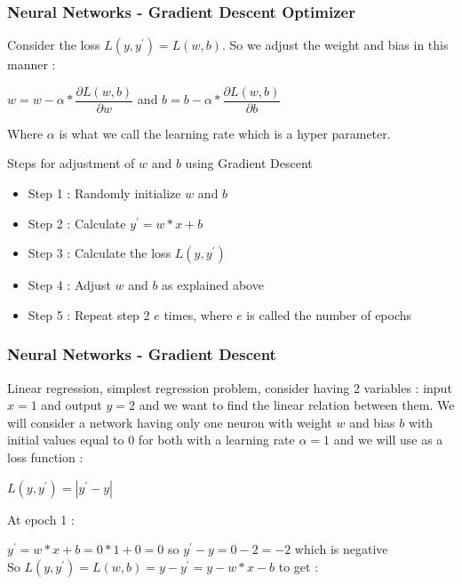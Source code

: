 \documentclass{beamer}
\begin{document}
\begin{frame}

\frametitle{Neural Networks - Gradient Descent Optimizer}
Consider the loss $ L(y,y^{\prime}) = L(w,b) $. So we adjust the weight and bias in this manner :\\
\begin{center}
$ w = w - \alpha*\dfrac{\partial L(w,b)}{\partial w} $ \hspace{1cm} and \hspace{1cm} $ b = b - \alpha*\dfrac{\partial L(w,b)}{\partial b} $
\end{center}
Where $ \alpha $ is what we call the learning rate which is a hyper parameter.
\begin{block}{Steps for adjustment of $ w $ and $ b $ using Gradient Descent}
\begin{itemize}
\item Step 1 : Randomly initialize $ w $ and $ b $
\item Step 2 : Calculate $ y^{\prime} = w*x + b $
\item Step 3 : Calculate the loss $ L(y,y^{\prime}) $
\item Step 4 : Adjust $ w $ and $ b $ as explained above
\item Step 5 : Repeat step 2 $ e $ times, where $ e $ is called the number of epochs
\end{itemize}
\end{block}

\end{frame}

\begin{frame}
\frametitle{Neural Networks - Gradient Descent}

\begin{example}
Linear regression, simplest regression problem, consider having 2 variables : input $ x = 1 $ and output $ y = 2 $ and we want to find the linear relation between them. We will consider a network having only one neuron with weight $ w $ and bias $ b $ with initial values equal to 0 for both with a learning rate $ \alpha = 1 $ and we will use as a loss function :\\
\begin{center}
$ L(y,y^{\prime}) = |y^{\prime} - y| $\\
\end{center}
At epoch 1 :
\begin{center}
$ y^{\prime} = w*x + b = 0*1 + 0 = 0 $ \hspace{5mm} so \hspace{5mm} $ y^{\prime} - y = 0 - 2 = -2 $ \hspace{5mm} which is negative\\
So \hspace{5mm} $ L(y,y^{\prime}) = L(w,b) = y - y^{\prime} = y - w*x - b $ \hspace{5mm} to get :
\end{center}

\end{example}

\end{frame}
\end{document}

